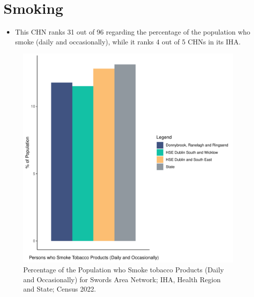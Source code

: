 \documentclass{article}
\begin{document}
\pagebreak

\section{Smoking}\label{sect:Smoking}
\begin{itemize}
\item This CHN ranks  31 out of 96 regarding the percentage of the population who smoke (daily and occasionally), while it ranks   4 out of 5 CHNs in its IHA.
\end{itemize}
\begin{figure}[H]
	\centering
	\includegraphics[width = 120mm]{../figures/SmokingED.pdf}
	\caption{Percentage of the Population who Smoke tobacco Products (Daily and Occasionally) for Swords Area Network; IHA, Health Region and State; Census 2022.}
	\label{fig:2ae19629-1a6a-13a3-e055-000000000001}
	\end{figure}
	
\end{document}
